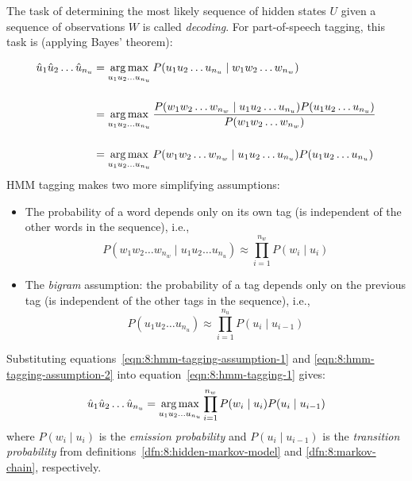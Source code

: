 The task of determining the most likely sequence of hidden states $U$ given a
sequence of observations $W$ is called \textit{decoding}.
For part-of-speech tagging, this task is (applying Bayes' theorem):

\begin{align}
  \hat{u}_1 \hat{u}_2 \dots \hat{u}_{n_u}
   & = \operatorname*{arg\,max}_{u_1 u_2 \dots u_{n_u}}
  P(u_1 u_2 \dots u_{n_u} \mid w_1 w_2 \dots w_{n_w})
  \\[3ex]
   & = \operatorname*{arg\,max}_{u_1 u_2 \dots u_{n_u}}
  \frac{P(w_1 w_2 \dots w_{n_w} \mid u_1 u_2 \dots u_{n_u}) P(u_1 u_2 \dots u_{n_u})}{P(w_1 w_2 \dots w_{n_w})}
  \\[3ex]
   & = \operatorname*{arg\,max}_{u_1 u_2 \dots u_{n_u}}
  P(w_1 w_2 \dots w_{n_w} \mid u_1 u_2 \dots u_{n_u}) P(u_1 u_2 \dots u_{n_u})
  \label{eqn:8:hmm-tagging-1}
\end{align}
HMM tagging makes two more simplifying assumptions:
\begin{itemize}
  \item The probability of a word depends only on its own tag (is independent of
        the other words in the sequence), i.e.,
        \begin{equation}
          \label{eqn:8:hmm-tagging-assumption-1}
          P(w_1 w_2 \dots w_{n_w} \mid u_1 u_2 \dots u_{n_u})
          \approx \prod_{i = 1}^{n_w} P(w_i \mid u_i)
        \end{equation}
  \item The \textit{bigram} assumption: the probability of a tag depends only on
        the previous tag (is independent of the other tags in the sequence),
        i.e.,
        \begin{equation}
          \label{eqn:8:hmm-tagging-assumption-2}
          P(u_1 u_2 \dots u_{n_u})
          \approx \prod_{i = 1}^{n_u} P(u_i \mid u_{i - 1})
        \end{equation}
\end{itemize}
Substituting equations~\ref{eqn:8:hmm-tagging-assumption-1} and
\ref{eqn:8:hmm-tagging-assumption-2} into equation~\ref{eqn:8:hmm-tagging-1}
gives:
\begin{equation}
  \hat{u}_1 \hat{u}_2 \dots \hat{u}_{n_u}
  = \operatorname*{arg\,max}_{u_1 u_2 \dots u_{n_u}}
  \prod_{i = 1}^{n_w}
  P(w_i \mid u_i) P(u_i \mid u_{i - 1})
\end{equation}
where $P(w_i \mid u_i)$ is
the \textit{emission probability} and $P(u_i \mid u_{i - 1})$ is the
\textit{transition probability} from
definitions~\ref{dfn:8:hidden-markov-model} and \ref{dfn:8:markov-chain},
respectively.

